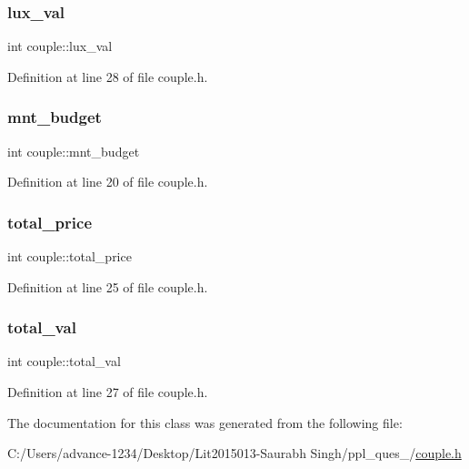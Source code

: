 \subsubsection{\texorpdfstring{lux\+\_\+val}{lux\_val}}
{\footnotesize\ttfamily int couple\+::lux\+\_\+val}



Definition at line 28 of file couple.\+h.

\mbox{\label{classcouple_a1f8e27a6a1dfc8b9555c81d9a1d17741}} 
\subsubsection{\texorpdfstring{mnt\+\_\+budget}{mnt\_budget}}
{\footnotesize\ttfamily int couple\+::mnt\+\_\+budget}



Definition at line 20 of file couple.\+h.

\mbox{\label{classcouple_a2f952dd595fe1b36047cede289a91f77}} 
\subsubsection{\texorpdfstring{total\+\_\+price}{total\_price}}
{\footnotesize\ttfamily int couple\+::total\+\_\+price}



Definition at line 25 of file couple.\+h.

\mbox{\label{classcouple_a3624df5a498ec1b985f06f53fd3853bf}} 
\subsubsection{\texorpdfstring{total\+\_\+val}{total\_val}}
{\footnotesize\ttfamily int couple\+::total\+\_\+val}



Definition at line 27 of file couple.\+h.



The documentation for this class was generated from the following file\+:\begin{DoxyCompactItemize}
\item 
C\+:/\+Users/advance-\/1234/\+Desktop/\+Lit2015013-\/\+Saurabh Singh/ppl\+\_\+ques\+\_/\hyperlink{couple_8h}{couple.\+h}\end{DoxyCompactItemize}
